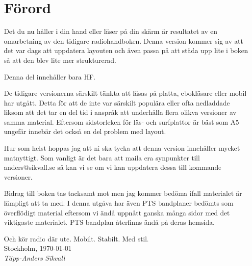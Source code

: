 \section*{Förord}

Det du nu håller i din hand eller läser på din skärm är resultatet av en omarbetning av den tidigare radiohandboken. Denna version kommer sig av att det var dags att uppdatera layouten och även passa på att städa upp lite i boken så att den blev lite mer strukturerad.

Denna del innehåller bara HF.

De tidigare versionerna särskilt tänkta att läsas på platta, ebokläsare eller mobil har utgått. Detta för att de inte var särskilt populära eller ofta nedladdade liksom att det tar en del tid i anspråk att underhålla flera olikva versioner av samma material. Eftersom sidstorleken för läs- och surfplattor är bäst som A5 ungefär innebär det också en del problem med layout.

Hur som helst hoppas jag att ni ska tycka att denna version innehåller mycket matnyttigt. Som vanligt är det bara att maila era synpunkter till anders@sikvall.se så kan vi se om vi kan uppdatera dessa till kommande versioner.

Bidrag till boken tas tacksamt mot men jag kommer bedöma ifall materialet är lämpligt att ta med. I denna utgåva har även PTS bandplaner bedömts som överflödigt material eftersom vi ändå uppnått ganska många sidor med det viktigaste materialet. PTS bandplan återfinns ändå på deras hemsida.

Och kör radio där ute. Mobilt. Stabilt. Med stil.\\[4em]

Stockholm, \today\\
\textit{Täpp-Anders Sikvall}

\clearpage